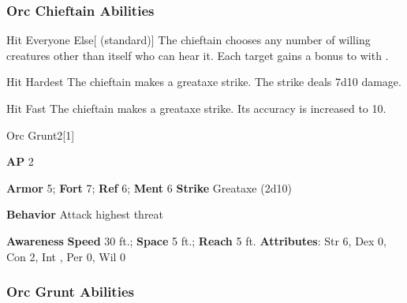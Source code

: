 \subsubsection{Orc Chieftain Abilities}

\begin{freeability}{Hit Everyone Else}[ (standard)]
The chieftain chooses any number of willing creatures other than itself who can hear it.
Each target gains a  bonus to  with .
\end{freeability}

\vspace{0.5em}
\begin{freeability}{Hit Hardest}
The chieftain makes a greataxe strike.
The strike deals 7d10 damage.
\end{freeability}

\vspace{0.5em}
\begin{freeability}{Hit Fast}
The chieftain makes a greataxe strike.
Its accuracy is increased to 10.
\end{freeability}

\begin{monsection}{Orc Grunt}{2}[1]
\vspace{-1em}\vspace{-1em}
\begin{spellcontent}
\begin{spelltargetinginfo}
{\textbf{AP} 2}

\pari \textbf{Armor} 5;
\textbf{Fort} 7;
\textbf{Ref} 6;
\textbf{Ment} 6
\pari \textbf{Strike} Greataxe  (2d10)



\pari \textbf{Behavior} Attack highest threat
\end{spelltargetinginfo}
\end{spellcontent}

\begin{monsterfooter}
\pari \textbf{Awareness} 
\pari \textbf{Speed} 30 ft.;
\textbf{Space} 5 ft.;
\textbf{Reach} 5 ft.
\pari \textbf{Attributes}:
Str 6,
Dex 0,
Con 2,
Int ,
Per 0,
Wil 0
\end{monsterfooter}
\end{monsection}


\subsubsection{Orc Grunt Abilities}

